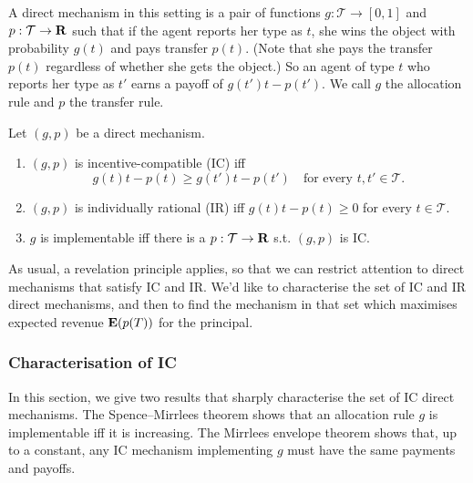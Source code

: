 \documentclass[11pt,letterpaper,reqno,oneside]{article}
\begin{document}
A direct mechanism in this setting is a pair of functions $g : \mathcal{T} \to [0,1]$ and $p : \mathcal{T} \to \mathbf{R}$ such that if the agent reports her type as $t$, she wins the object with probability $g(t)$ and pays transfer $p(t)$. (Note that she pays the transfer $p(t)$ regardless of whether she gets the object.) So an agent of type $t$ who reports her type as $t'$ earns a payoff of $g(t') t - p(t')$. We call $g$ the allocation rule and $p$ the transfer rule.

\begin{definition}
	Let $(g,p)$ be a direct mechanism.
	\begin{enumerate}

		\item $(g,p)$ is incentive-compatible (IC) iff
		\begin{equation*}
			g(t) t - p(t) \geq g(t') t - p(t')
			\quad\text{for every $t,t' \in \mathcal{T}$} .
		\end{equation*}

		\item $(g,p)$ is individually rational (IR) iff $g(t) t - p(t) \geq 0$ for every $t \in \mathcal{T}$.

		\item $g$ is implementable iff there is a $p : \mathcal{T} \to \mathbf{R}$ s.t. $(g,p)$ is IC.

	\end{enumerate}
\end{definition}

As usual, a revelation principle applies, so that we can restrict attention to direct mechanisms that satisfy IC and IR. We'd like to characterise the set of IC and IR direct mechanisms, and then to find the mechanism in that set which maximises expected revenue $\mathbf{E}(p(T))$ for the principal. %



\subsubsection{Characterisation of IC}
\label{sec:mech_desi:single_agent_one_dimension:IC_characterisation}

In this section, we give two results that sharply characterise the set of IC direct mechanisms. The Spence--Mirrlees theorem shows that an allocation rule $g$ is implementable iff it is increasing. The Mirrlees envelope theorem shows that, up to a constant, any IC mechanism implementing $g$ must have the same payments and payoffs.
\end{document}
